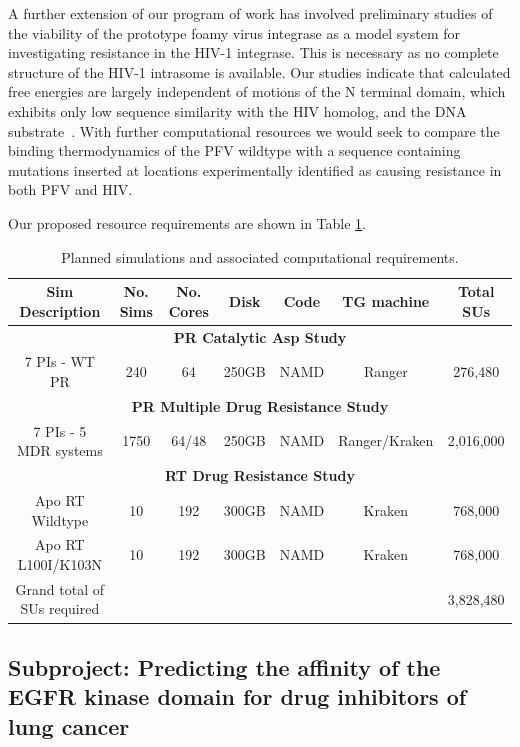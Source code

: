 \documentclass[a4paper,10pt]{article}
\begin{document}
A further extension of our program of work has involved preliminary studies of the viability of the prototype foamy virus integrase as a model system for investigating resistance in the HIV-1 integrase. This is necessary as no complete structure of the HIV-1 intrasome is available. Our studies indicate that calculated free energies are largely independent of motions of the N terminal domain, which exhibits only low sequence similarity with the HIV homolog, and the DNA substrate~\cite{Ref5}. With further computational resources we would seek to compare the binding thermodynamics of the PFV wildtype with a sequence containing mutations inserted at locations experimentally identified as causing resistance in both PFV and HIV.

Our proposed resource requirements are shown in Table \ref{t:hiv_req}.

\begin{table}[h]
\scriptsize
\centering
\begin{tabular}[b]
{|c|c|c|c|c|c|c|}
\hline
\textbf{Sim Description} & \textbf{No. Sims} &
\textbf{No. Cores} & \textbf{Disk} &
\textbf{Code} & \textbf{TG machine} & \textbf{Total SUs}\\
\hline
\multicolumn{7}{|c|}{\textbf{PR Catalytic Asp Study}}\\
\hline
7 PIs - WT PR & 240 & 64 & 250GB & NAMD & Ranger & 276,480 \\
\hline
\multicolumn{7}{|c|}{\textbf{PR Multiple Drug Resistance Study}}\\
\hline
7 PIs - 5 MDR systems & 1750 & 64/48 & 250GB & NAMD & Ranger/Kraken & 2,016,000 \\
\hline
\multicolumn{7}{|c|}{\textbf{RT Drug Resistance Study}}\\
\hline
Apo RT Wildtype & 10 & 192 & 300GB & NAMD & Kraken & 768,000\\
\hline
Apo RT L100I/K103N & 10 & 192 & 300GB & NAMD & Kraken & 768,000\\
\hline
Grand total of SUs required & & & & & & 3,828,480\\
\hline
\end{tabular} \caption{Planned simulations and associated computational requirements.}
\label{t:hiv_req}
\end{table}



\subsection{Subproject: Predicting the affinity of the EGFR kinase domain for drug inhibitors of lung cancer}
\end{document}
